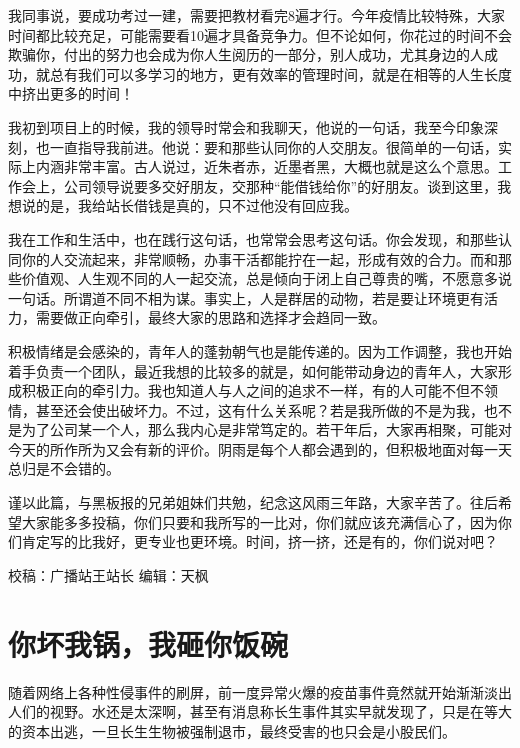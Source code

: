 \documentclass[
]{book}
\begin{document}
我同事说，要成功考过一建，需要把教材看完8遍才行。今年疫情比较特殊，大家时间都比较充足，可能需要看10遍才具备竞争力。但不论如何，你花过的时间不会欺骗你，付出的努力也会成为你人生阅历的一部分，别人成功，尤其身边的人成功，就总有我们可以多学习的地方，更有效率的管理时间，就是在相等的人生长度中挤出更多的时间！

我初到项目上的时候，我的领导时常会和我聊天，他说的一句话，我至今印象深刻，也一直指导我前进。他说：要和那些认同你的人交朋友。很简单的一句话，实际上内涵非常丰富。古人说过，近朱者赤，近墨者黑，大概也就是这么个意思。工作会上，公司领导说要多交好朋友，交那种``能借钱给你''的好朋友。谈到这里，我想说的是，我给站长借钱是真的，只不过他没有回应我。

我在工作和生活中，也在践行这句话，也常常会思考这句话。你会发现，和那些认同你的人交流起来，非常顺畅，办事干活都能拧在一起，形成有效的合力。而和那些价值观、人生观不同的人一起交流，总是倾向于闭上自己尊贵的嘴，不愿意多说一句话。所谓道不同不相为谋。事实上，人是群居的动物，若是要让环境更有活力，需要做正向牵引，最终大家的思路和选择才会趋同一致。

积极情绪是会感染的，青年人的蓬勃朝气也是能传递的。因为工作调整，我也开始着手负责一个团队，最近我想的比较多的就是，如何能带动身边的青年人，大家形成积极正向的牵引力。我也知道人与人之间的追求不一样，有的人可能不但不领情，甚至还会使出破坏力。不过，这有什么关系呢？若是我所做的不是为我，也不是为了公司某一个人，那么我内心是非常笃定的。若干年后，大家再相聚，可能对今天的所作所为又会有新的评价。阴雨是每个人都会遇到的，但积极地面对每一天总归是不会错的。

谨以此篇，与黑板报的兄弟姐妹们共勉，纪念这风雨三年路，大家辛苦了。往后希望大家能多多投稿，你们只要和我所写的一比对，你们就应该充满信心了，因为你们肯定写的比我好，更专业也更环境。时间，挤一挤，还是有的，你们说对吧？

校稿：广播站王站长
编辑：天枫

\hypertarget{ux4f60ux574fux6211ux9505ux6211ux7838ux4f60ux996dux7897}{%
\section{你坏我锅，我砸你饭碗}\label{ux4f60ux574fux6211ux9505ux6211ux7838ux4f60ux996dux7897}}

随着网络上各种性侵事件的刷屏，前一度异常火爆的疫苗事件竟然就开始渐渐淡出人们的视野。水还是太深啊，甚至有消息称长生事件其实早就发现了，只是在等大的资本出逃，一旦长生生物被强制退市，最终受害的也只会是小股民们。
\end{document}
